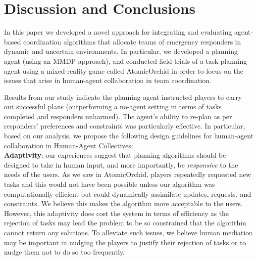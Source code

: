 \section{Discussion and Conclusions}\label{sec:conclusions}
\noindent In this paper we developed a novel approach for integrating and evaluating agent-based coordination algorithms that allocate teams of emergency responders in dynamic and uncertain environments.  In particular, we developed a planning agent (using an MMDP approach), and conducted field-trials of a task planning agent using a mixed-reality game  called AtomicOrchid in order to focus on the issues that arise in human-agent collaboration in team coordination.

Results from our study indicate  the planning agent instructed players to carry out successful plans (outperforming a no-agent setting in terms of tasks completed and responders unharmed). The agent's ability to re-plan  as per responders' preferences and constraints was particularly effective. In particular, based on our analysis, we propose the following design guidelines for human-agent collaboration in Human-Agent Collectives:\\

\noindent \textbf{Adaptivity}: our experiences suggest that planning algorithms should be designed to take in human input, and more importantly, be \emph{responsive} to the needs of the users. As we saw in AtomicOrchid, players repeatedly requested new tasks and this would not have been possible unless our algorithm  was computationally efficient but could dynamically assimilate updates, requests, and constraints. We believe this makes the algorithm more acceptable to the users. However, this adaptivity does cost the system in terms of efficiency as the rejection of tasks may lead the problem to be so constrained that the algorithm cannot return any solutions. To alleviate such issues, we believe human mediation may be important in nudging the players to justify their rejection of tasks or to nudge them not to do so too frequently. \\

